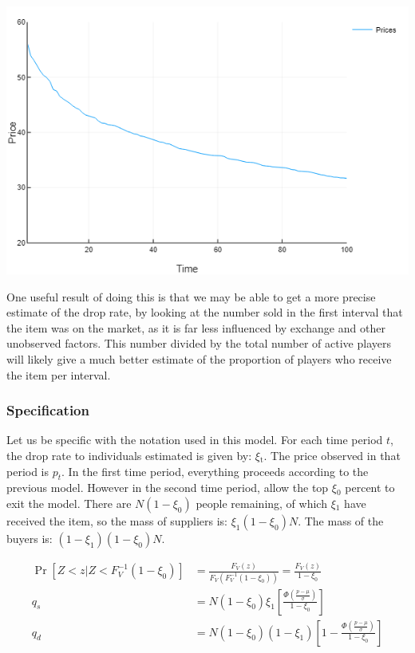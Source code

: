 \documentclass[12pt, letterpaper]{paper}
\begin{document}
\includegraphics[width=.9\linewidth]{../Scripts/PriceOverTime.png}

One useful result of doing this is that we may be able to get a more
precise estimate of the drop rate, by looking at the number sold in
the first interval that the item was on the market, as it is far less
influenced by exchange and other unobserved factors. This number
divided by the total number of active players will likely give a much
better estimate of the proportion of players who receive the item per
interval.

\subsubsection{Specification}
\label{sec-2-3-1}

Let us be specific with the notation used in this model. For each time
period $t$, the drop rate to individuals estimated is given by: $\xi$$_{\text{t}}$. The
price observed in that period is $p_t$. In the first time period,
everything proceeds according to the previous model. However in the
second time period, allow the top $\xi$$_{\text{0}}$ percent to exit the
model. There are $N(1-\xi_0)$ people remaining, of which $\xi$$_{\text{1}}$ have received
the item, so the mass of suppliers is: $\xi_1 (1-\xi_0)N$. The mass of the
buyers is: $(1-\xi_1)(1-\xi_0)N$. 

\begin{align*}
\Pr \left [ Z < z | Z < F_V^{-1}( 1 - \xi_0 )^{} \right ] &=
\frac { F_V ( z ) }{  F_V ( F_V^{-1} ( 1 - \xi_0 ) ) } = \frac{ F_V (z)
}{1 - \xi_0}\\
q_s &= N ( 1-\xi_0 )\xi_1 \left [ \frac{\Phi \left ( \frac{ p - \mu }{\sigma} \right )}{ 1 - \xi_0 } \right ]\\
q_d &= N ( 1-\xi_0 )(1-\xi_1) \left [ 1 - \frac{ \Phi \left ( \frac{
p - \mu }{ \sigma } \right ) }{ 1 - \xi_0 } \right ]
\end{align*}
\end{document}
